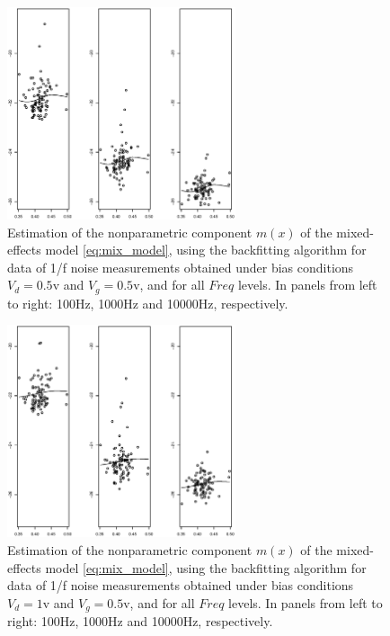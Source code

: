 \documentclass[sn-mathphys]{sn-jnl}%
\theoremstyle{thmstyleone}%
\theoremstyle{thmstyletwo}%
\theoremstyle{thmstylethree}%
\begin{document}
\begin{figure}[ht]
	\centerline{\includegraphics [width=0.6\textwidth]{Fig8_elognoise_d05g05.eps}}%
	\caption{Estimation of the nonparametric component $m(x)$ of the mixed-effects model \eqref{eq:mix_model}, using the backfitting algorithm for data of 1/f noise measurements obtained under bias conditions $V_d=0.5$v and $V_g=0.5$v, and for all $Freq$ levels. In panels from left to right: 100Hz, 1000Hz and 10000Hz, respectively.}
	\label{fig:backfit1}
\end{figure}
\begin{figure}[ht]
	\centerline{\includegraphics [width=0.6\textwidth]{Fig9_elognoise_d1g05.eps}}%
	\caption{Estimation of the nonparametric component $m(x)$ of the mixed-effects model \eqref{eq:mix_model}, using the backfitting algorithm for data of 1/f noise measurements obtained under bias conditions $V_d=1$v and $V_g=0.5$v, and for all $Freq$ levels. In panels from left to right: 100Hz, 1000Hz and 10000Hz, respectively.}
	\label{fig:backfit2}
\end{figure}
\end{document}
